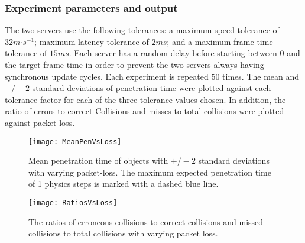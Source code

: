 \subsubsection{Experiment parameters and output}
The two servers use the following tolerances: a maximum speed tolerance of $32m\mathord{\cdot}s^{-1}$; maximum latency tolerance of $2ms$; and a maximum frame-time tolerance of $15ms$. Each server has a random delay before starting between $0$ and the target frame-time in order to prevent the two servers always having synchronous update cycles. Each experiment is repeated $50$ times. The mean and $+/-2$ standard deviations of penetration time were plotted against each tolerance factor for each of the three tolerance values chosen. In addition, the ratio of errors to correct Collisions and misses to total collisions were plotted against packet-loss.

\begin{figure}[t]
	\texttt{[image: MeanPenVsLoss]}
	\caption{Mean penetration time of objects with $+/-2$ standard deviations with varying packet-loss. The maximum expected penetration time of 1 physics steps is marked with a dashed blue line.}
	\label{fig_CollisionsPenVsLoss}
\end{figure}
\begin{figure}[t]
	\centering
	\texttt{[image: RatiosVsLoss]}
	\caption{The ratios of erroneous collisions to correct collisions and missed collisions to total collisions with varying packet loss.} %
	\label{fig_RatiosVsLoss}
\end{figure}

